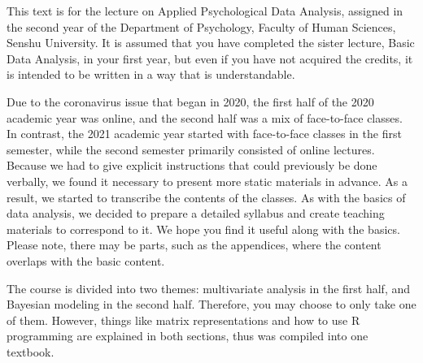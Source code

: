 This text is for the lecture on Applied Psychological Data Analysis, assigned in the second year of the Department of Psychology, Faculty of Human Sciences, Senshu University. It is assumed that you have completed the sister lecture, Basic Data Analysis, in your first year, but even if you have not acquired the credits, it is intended to be written in a way that is understandable.

Due to the coronavirus issue that began in 2020, the first half of the 2020 academic year was online, and the second half was a mix of face-to-face classes. In contrast, the 2021 academic year started with face-to-face classes in the first semester, while the second semester primarily consisted of online lectures. Because we had to give explicit instructions that could previously be done verbally, we found it necessary to present more static materials in advance. As a result, we started to transcribe the contents of the classes.
As with the basics of data analysis, we decided to prepare a detailed syllabus and create teaching materials to correspond to it. We hope you find it useful along with the basics.
Please note, there may be parts, such as the appendices, where the content overlaps with the basic content.

The course is divided into two themes: multivariate analysis in the first half, and Bayesian modeling in the second half. Therefore, you may choose to only take one of them. However, things like matrix representations and how to use R programming are explained in both sections, thus was compiled into one textbook.



